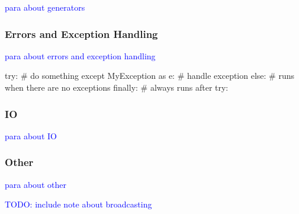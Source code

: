 \textcolor{blue}{para about generators}

\subsubsection{Errors and Exception Handling}

\textcolor{blue}{para about errors and exception handling}

\begin{python}
try:
    # do something
except MyException as e:
    # handle exception
else:
    # runs when there are no exceptions
finally:
    # always runs after try:
\end{python}


\subsubsection{IO}

\textcolor{blue}{para about IO}

\subsubsection{Other}

\textcolor{blue}{para about other}

\textcolor{blue}{TODO: include note about broadcasting}


